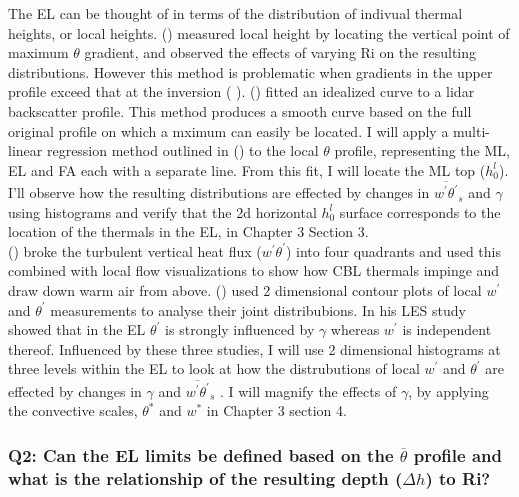 The \acs{EL} can be thought of in terms of the distribution of indivual thermal heights, or local heights. \citeauthor{SullMoengStev} (\citeyear{SullMoengStev}) measured local height by locating the vertical point of maximum $\theta$ gradient, and observed the effects of varying \acs{Ri} on the resulting distributions. However this method is problematic when gradients in the upper profile exceed that at the inversion (\citeauthor{BrooksFowler2} \citeyear{BrooksFowler2}).  \citeauthor{SteynBaldHoff} (\citeyear{SteynBaldHoff}) fitted an idealized curve to a lidar backscatter profile.  This method produces a smooth curve based on the full original profile on which a mximum can easily be located.  I will apply a multi-linear regression method outlined in \citeauthor{Vieth} (\citeyear{Vieth}) to the local $\theta$ profile, representing the \acs{ML}, \acs{EL} and \acs{FA} each with a separate line. From this fit, I will locate the \acs{ML} top ($h^{l}_{0}$).  I'll observe how the resulting distributions are effected by changes in $\overline{w^{'}\theta^{'}}_{s}$ and $\gamma$ using histograms and verify that the 2d horizontal $h^{l}_{0}$ surface corresponds to the location of the thermals in the \acs{EL}, in Chapter 3 Section 3.\\

\citeauthor{SullMoengStev} (\citeyear{SullMoengStev}) broke the turbulent vertical heat flux ($w^{'}\theta^{'}$) into four quadrants and used this combined with local flow visualizations to show how \acs{CBL} thermals impinge and draw down warm air from above. \citeauthor{MahrtPaum} (\citeyear{MahrtPaum}) used 2 dimensional contour plots of local $w^{'}$ and $\theta^{'}$ measurements to analyse their joint distribubions.  In his \citeyear{Sorbjan} \acs{LES} study \citeauthor{Sorbjan} showed that in the \acs{EL} $\theta^{'}$ is strongly influenced by $\gamma$  whereas $w^{'}$ is independent thereof.  Influenced by these three studies, I will use 2 dimensional histograms at three levels within the \acs{EL} to look at how the distrubutions of local $w^{'}$ and $\theta^{'}$ are effected by changes in $\gamma$ and $\overline{w^{'}\theta^{'}}_{s}$ .  I will magnify the effects of $\gamma$, by applying the convective scales, $\theta^{*}$ and $w^{*}$ in Chapter 3 section 4.\\    

\subsubsection{Q2: Can the \acs{EL} limits be defined based on the $\overline{\theta}$ profile and what is the relationship of the resulting depth ($\Delta h$) to \acs{Ri}?}
       
